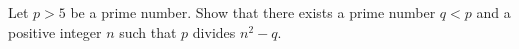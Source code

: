 Let $p > 5$ be a prime number. Show that there exists a prime number $q < p$ and a positive integer $n$ such that $p$ divides $n^2-q$.

